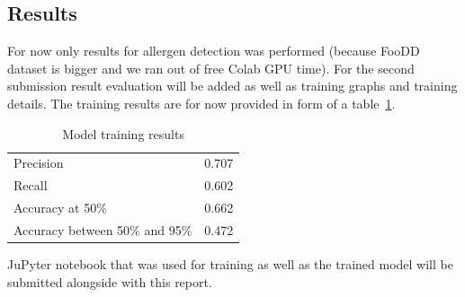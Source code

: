 \documentclass[10pt,twocolumn,letterpaper]{article}
\begin{document}
\subsection{Results}

For now only results for allergen detection was performed (because FooDD dataset is bigger and we ran out of free Colab GPU time).
For the second submission result evaluation will be added as well as training graphs and training details.
The training results are for now provided in form of a table~\ref{results-table}.

\begin{table}[!h]
    \begin{center}
        \caption{Model training results}\label{results-table}
        \begin{tabular}{ l c }
            \toprule
            Precision & 0.707 \\
            Recall & 0.602 \\
            Accuracy at 50\% & 0.662 \\
            Accuracy between 50\% and 95\% & 0.472 \\
            \bottomrule
        \end{tabular}
    \end{center}
\end{table}

JuPyter notebook that was used for training as well as the trained model will be submitted alongside with this report.
\end{document}
